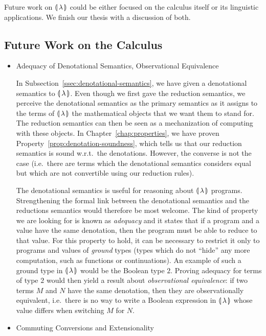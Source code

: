 Future work on ${\llparenthesis \, \lambda \, \rrparenthesis}$ could be either focused on the calculus itself or
its linguistic applications. We finish our thesis with a discussion of
both.


\subsection{Future Work on the Calculus}
\label{ssec:future-work-calculus}

\begin{itemize}
\item Adequacy of Denotational Semantics, Observational Equivalence

  In Subsection~\ref{ssec:denotational-semantics}, we have given a
  denotational semantics to ${\llparenthesis \, \lambda \, \rrparenthesis}$. Even though we first gave the
  reduction semantics, we perceive the denotational semantics as the
  primary semantics as it assigns to the terms of ${\llparenthesis \, \lambda \, \rrparenthesis}$ the mathematical
  objects that we want them to stand for. The reduction semantics can then
  be seen as a mechanization of computing with these objects. In
  Chapter~\ref{chap:properties}, we have proven
  Property~\ref{prop:denotation-soundness}, which tells us that our
  reduction semantics is sound w.r.t.\ the denotations. However, the
  converse is not the case (i.e.\ there are terms which the denotational
  semantics considers equal but which are not convertible using our
  reduction rules).

  The denotational semantics is useful for reasoning about ${\llparenthesis \, \lambda \, \rrparenthesis}$
  programs. Strengthening the formal link between the denotational
  semantics and the reductions semantics would therefore be most
  welcome. The kind of property we are looking for is known as
  \emph{adequacy} and it states that if a program and a value have the same
  denotation, then the program must be able to reduce to that value. For
  this property to hold, it can be necessary to restrict it only to
  programs and values of \emph{ground} types (types which do not ``hide''
  any more computation, such as functions or continuations). An example of
  such a ground type in ${\llparenthesis \, \lambda \, \rrparenthesis}$ would be the Boolean type $2$. Proving
  adequacy for terms of type $2$ would then yield a result about
  \emph{observational equivalence}: if two terms $M$ and $N$ have the same
  denotation, then they are observationally equivalent, i.e.\ there is no
  way to write a Boolean expression in ${\llparenthesis \, \lambda \, \rrparenthesis}$ whose value differs when
  switching $M$ for $N$.


\item Commuting Conversions and Extensionality


\end{itemize}

